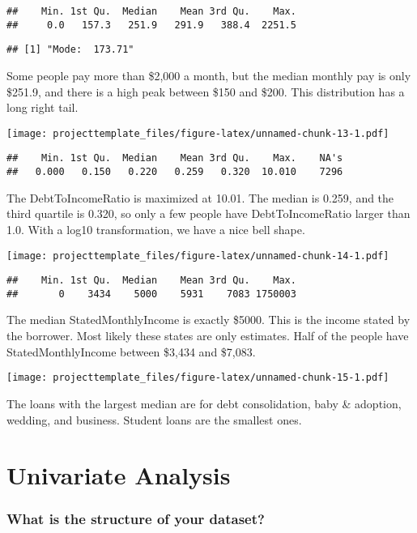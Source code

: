 \documentclass[]{article}
\begin{document}
\begin{verbatim}
##    Min. 1st Qu.  Median    Mean 3rd Qu.    Max. 
##     0.0   157.3   251.9   291.9   388.4  2251.5
\end{verbatim}

\begin{verbatim}
## [1] "Mode:  173.71"
\end{verbatim}

Some people pay more than \$2,000 a month, but the median monthly pay is
only \$251.9, and there is a high peak between \$150 and \$200. This
distribution has a long right tail.

\texttt{[image: projecttemplate\_files/figure-latex/unnamed-chunk-13-1.pdf]}

\begin{verbatim}
##    Min. 1st Qu.  Median    Mean 3rd Qu.    Max.    NA's 
##   0.000   0.150   0.220   0.259   0.320  10.010    7296
\end{verbatim}

The DebtToIncomeRatio is maximized at 10.01. The median is 0.259, and
the third quartile is 0.320, so only a few people have DebtToIncomeRatio
larger than 1.0. With a log10 transformation, we have a nice bell shape.

\texttt{[image: projecttemplate\_files/figure-latex/unnamed-chunk-14-1.pdf]}

\begin{verbatim}
##    Min. 1st Qu.  Median    Mean 3rd Qu.    Max. 
##       0    3434    5000    5931    7083 1750003
\end{verbatim}

The median StatedMonthlyIncome is exactly \$5000. This is the income
stated by the borrower. Most likely these states are only estimates.
Half of the people have StatedMonthlyIncome between \$3,434 and \$7,083.

\texttt{[image: projecttemplate\_files/figure-latex/unnamed-chunk-15-1.pdf]}

The loans with the largest median are for debt consolidation, baby \&
adoption, wedding, and business. Student loans are the smallest ones.

\section{Univariate Analysis}\label{univariate-analysis}

\subsubsection{What is the structure of your
dataset?}\label{what-is-the-structure-of-your-dataset}
\end{document}
